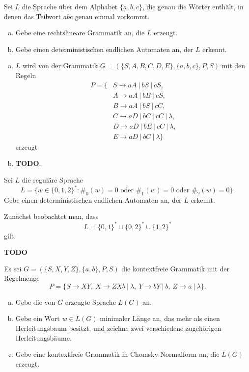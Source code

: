 \documentclass[german,headsepline]{scrartcl}
\theoremstyle{definition}
\begin{document}
	\begin{question}
		Sei $L$ die Sprache über dem Alphabet $\{a,b,c\}$, die genau die Wörter enthält,
		in denen das Teilwort $abc$ genau einmal vorkommt.
		\begin{enumerate}[(a)]
			\item Gebe eine rechtslineare Grammatik an, die $L$ erzeugt.
			\item Gebe einen deterministischen endlichen Automaten an, der $L$ erkennt.
		\end{enumerate}
	\end{question}
	\begin{solution}
		\begin{enumerate}[(a)]
			\item $L$ wird von der Grammatik $G=(\{S,A,B,C,D,E\},\{a,b,c\},P,S)$ mit den Regeln
				\begin{align*}
					P=\{&S\rightarrow aA~|~bS~|~cS, \\
					&A\rightarrow aA~|~bB~|~cS, \\
					&B\rightarrow aA~|~bS~|~cC, \\
					&C\rightarrow aD~|~bC~|~cC~|~\lambda, \\
					&D\rightarrow aD~|~bE~|~cC~|~\lambda, \\
					&E\rightarrow aD~|~bC~|~\lambda\}
				\end{align*}
				erzeugt
			\item \textbf{TODO}.
		\end{enumerate}
	\end{solution}
	
	\begin{question}
		Sei $L$ die reguläre Sprache
		\[L=\{w\in\{0,1,2\}^*\colon\#_0(w)=0\text{ oder }\#_1(w)=0\text{ oder }\#_2(w)=0\}.\]
		Gebe einen deterministischen endlichen Automaten an, der $L$ erkennt.
	\end{question}
	\begin{solution}
		Zunächst beobachtet man, dass
		\[L=\{0,1\}^*\cup\{0,2\}^*\cup\{1,2\}^*\]
		gilt.
		
		\textbf{TODO}
	\end{solution}
	
	\begin{question}[subtitle={Klausur 2012}]
		Es sei $G=(\{S,X,Y,Z\},\{a,b\},P,S)$ die kontextfreie Grammatik mit der Regelmenge
		\[P=\{S\to XY,~X\to ZXb~|~\lambda,~Y\to bY~|~b,~Z\to a~|~\lambda\}.\]
		\begin{enumerate}[(a)]
			\item Gebe die von $G$ erzeugte Sprache $L(G)$ an.
			\item Gebe ein Wort $w\in L(G)$ minimaler Länge an,
				das mehr als einen Herleitungsbaum besitzt,
				und zeichne zwei verschiedene zugehörigen Herleitungsbäume.
			\item Gebe eine kontextfreie Grammatik in Chomsky-Normalform an, die $L(G)$ erzeugt.
		\end{enumerate}
	\end{question}
\end{document}
